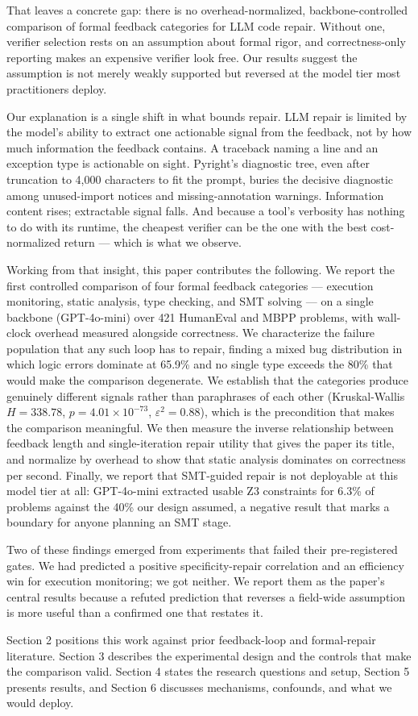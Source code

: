 That leaves a concrete gap: there is no overhead-normalized, backbone-controlled comparison of formal feedback categories for LLM code repair. Without one, verifier selection rests on an assumption about formal rigor, and correctness-only reporting makes an expensive verifier look free. Our results suggest the assumption is not merely weakly supported but reversed at the model tier most practitioners deploy.

Our explanation is a single shift in what bounds repair. LLM repair is limited by the model's ability to extract one actionable signal from the feedback, not by how much information the feedback contains. A traceback naming a line and an exception type is actionable on sight. Pyright's diagnostic tree, even after truncation to 4,000 characters to fit the prompt, buries the decisive diagnostic among unused-import notices and missing-annotation warnings. Information content rises; extractable signal falls. And because a tool's verbosity has nothing to do with its runtime, the cheapest verifier can be the one with the best cost-normalized return --- which is what we observe.

Working from that insight, this paper contributes the following. We report the first controlled comparison of four formal feedback categories --- execution monitoring, static analysis, type checking, and SMT solving --- on a single backbone (GPT-4o-mini) over 421 HumanEval and MBPP problems, with wall-clock overhead measured alongside correctness. We characterize the failure population that any such loop has to repair, finding a mixed bug distribution in which logic errors dominate at 65.9\% and no single type exceeds the 80\% that would make the comparison degenerate. We establish that the categories produce genuinely different signals rather than paraphrases of each other (Kruskal-Wallis $H{=}338.78$, $p{=}4.01{\times}10^{-73}$, $\varepsilon^2{=}0.88$), which is the precondition that makes the comparison meaningful. We then measure the inverse relationship between feedback length and single-iteration repair utility that gives the paper its title, and normalize by overhead to show that static analysis dominates on correctness per second. Finally, we report that SMT-guided repair is not deployable at this model tier at all: GPT-4o-mini extracted usable Z3 constraints for 6.3\% of problems against the 40\% our design assumed, a negative result that marks a boundary for anyone planning an SMT stage.

Two of these findings emerged from experiments that failed their pre-registered gates. We had predicted a positive specificity-repair correlation and an efficiency win for execution monitoring; we got neither. We report them as the paper's central results because a refuted prediction that reverses a field-wide assumption is more useful than a confirmed one that restates it.

Section 2 positions this work against prior feedback-loop and formal-repair literature. Section 3 describes the experimental design and the controls that make the comparison valid. Section 4 states the research questions and setup, Section 5 presents results, and Section 6 discusses mechanisms, confounds, and what we would deploy.
